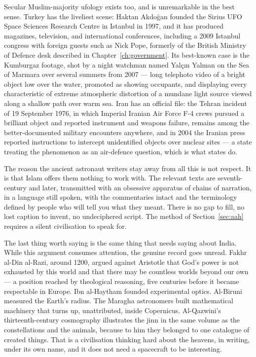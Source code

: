 Secular Muslim-majority ufology exists too, and is unremarkable in the best sense. Turkey has the
liveliest scene: Haktan Akdo\u{g}an founded the Sirius UFO Space Sciences Research Centre in
Istanbul in 1997, and it has produced magazines, television, and international conferences,
including a 2009 Istanbul congress with foreign guests such as Nick Pope, formerly of the British
Ministry of Defence desk described in Chapter~\ref{ch:government}. Its best-known case is the
Kumburgaz footage, shot by a night watchman named Yal\c{c}\i n Yalman on the Sea of Marmara over
several summers from 2007 --- long telephoto video of a bright object low over the water, promoted
as showing occupants, and displaying every characteristic of extreme atmospheric distortion of a
mundane light source viewed along a shallow path over warm sea. Iran has an official file: the
Tehran incident of 19 September 1976, in which Imperial Iranian Air Force F-4 crews pursued a
brilliant object and reported instrument and weapons failure, remains among the better-documented
military encounters anywhere, and in 2004 the Iranian press reported instructions to intercept
unidentified objects over nuclear sites --- a state treating the phenomenon as an air-defence
question, which is what states do.

The reason the ancient astronaut writers stay away from all this is not respect. It is that Islam
offers them nothing to work with. The relevant texts are seventh-century and later, transmitted
with an obsessive apparatus of chains of narration, in a language still spoken, with the
commentaries intact and the terminology defined by people who will tell you what they meant. There
is no gap to fill, no lost caption to invent, no undeciphered script. The method of
Section~\ref{sec:aah} requires a silent civilisation to speak for. 

The last thing worth saying is the same thing that needs saying about India. While this argument
consumes attention, the genuine record goes unread. Fakhr al-Din al-Razi, around 1200, argued
against Aristotle that God's power is not exhausted by this world and that there may be countless
worlds beyond our own --- a position reached by theological reasoning, five centuries before it
became respectable in Europe. Ibn al-Haytham founded experimental optics. Al-Biruni measured the
Earth's radius. The Maragha astronomers built mathematical machinery that turns up, unattributed,
inside Copernicus. Al-Qazwini's thirteenth-century cosmography illustrates the jinn in the same
volume as the constellations and the animals, because to him they belonged to one catalogue of
created things. That is a civilisation thinking hard about the heavens, in writing, under its own
name, and it does not need a spacecraft to be interesting.

